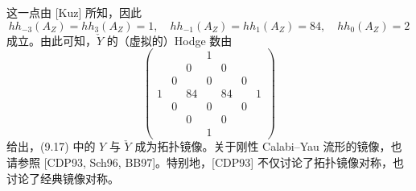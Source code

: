 这一点由 [Kuz] 所知，因此
\begin{equation}
    hh_{-3}(A_Z)=hh_3(A_Z)=1,\quad hh_{-1}(A_Z)=hh_1(A_Z)=84,\quad hh_0(A_Z)=2 \tag{14.8}
\end{equation}
成立。由此可知，$\check Y$ 的（虚拟的）Hodge 数由
\begin{equation}
    \begin{pmatrix}
      & & & 1 & & & \\
      & & 0 & & 0 & & \\
      & 0 & & 0 & & 0 & \\
      1 & & 84 & & 84 & & 1 \\
      & 0 & & 0 & & 0 & \\
      & & 0 & & 0 & & \\
      & & & 1 & & &
    \end{pmatrix} \tag{14.9}
\end{equation}
给出，(9.17) 中的 $Y$ 与 $\check Y$ 成为拓扑镜像。关于刚性 Calabi–Yau 流形的镜像，也请参照 [CDP93, Sch96, BB97]。特别地，[CDP93] 不仅讨论了拓扑镜像对称，也讨论了经典镜像对称。

